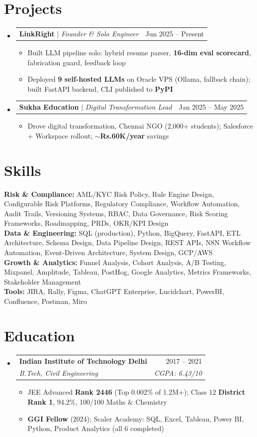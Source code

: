 \documentclass[a4paper,10pt]{article}
\makeatletter
\newcommand{\resumeItem}[1]{
  \item\small{#1\vspace{-2pt}}
}
\newcommand{\resumeSubheading}[4]{
  \vspace{-2pt}\item
  \begin{tabular*}{0.97\textwidth}[t]{l@{\extracolsep{\fill}}r}
    \textbf{#1} & #2 \\
    \textit{\small#3} & \textit{\small #4} \\
  \end{tabular*}\vspace{-7pt}
}
\newcommand{\resumeProjectHeading}[2]{
  \item
  \begin{tabular*}{0.97\textwidth}{l@{\extracolsep{\fill}}r}
    \small#1 & #2 \\
  \end{tabular*}\vspace{-7pt}
}
\newcommand{\resumeSubHeadingListStart}{\begin{itemize}[leftmargin=0.15in, label={}]}
\newcommand{\resumeSubHeadingListEnd}{\end{itemize}}
\newcommand{\resumeItemListStart}{\begin{itemize}\parfillskip=0pt}
\newcommand{\resumeItemListEnd}{\end{itemize}\vspace{-5pt}}
\makeatother
\begin{document}
\section{Projects}
\resumeSubHeadingListStart

  \resumeProjectHeading
    {\textbf{LinkRight} $|$ \emph{Founder \& Solo Engineer}}{Jun 2025 -- Present}
  \resumeItemListStart
    \resumeItem{Built LLM pipeline solo: hybrid resume parser, \textbf{16-dim eval scorecard}, fabrication guard, feedback loop}
    \resumeItem{Deployed \textbf{9 self-hosted LLMs} on Oracle VPS (Ollama, fallback chain); built FastAPI backend, CLI published to \textbf{PyPI}}
  \resumeItemListEnd

  \resumeProjectHeading
    {\textbf{Sukha Education} $|$ \emph{Digital Transformation Lead}}{Jan 2025 -- May 2025}
  \resumeItemListStart
    \resumeItem{Drove digital transformation, Chennai NGO (2,000+ students); Salesforce + Workspace rollout; \textbf{$\sim$Rs.60K/year} savings}
  \resumeItemListEnd

\resumeSubHeadingListEnd

\section{Skills}
\begin{itemize}[leftmargin=0.15in, label={}]
  \small{\item{
    \textbf{Risk \& Compliance:}{ AML/KYC Risk Policy, Rule Engine Design, Configurable Risk Platforms, Regulatory Compliance, Workflow Automation, Audit Trails, Versioning Systems, RBAC, Data Governance, Risk Scoring Frameworks, Roadmapping, PRDs, OKR/KPI Design} \\
    \textbf{Data \& Engineering:}{ SQL (production), Python, BigQuery, FastAPI, ETL Architecture, Schema Design, Data Pipeline Design, REST APIs, N8N Workflow Automation, Event-Driven Architecture, System Design, GCP/AWS} \\
    \textbf{Growth \& Analytics:}{ Funnel Analysis, Cohort Analysis, A/B Testing, Mixpanel, Amplitude, Tableau, PostHog, Google Analytics, Metrics Frameworks, Stakeholder Management} \\
    \textbf{Tools:}{ JIRA, Rally, Figma, ChatGPT Enterprise, Lucidchart, PowerBI, Confluence, Postman, Miro}
  }}
\end{itemize}

\section{Education}
\resumeSubHeadingListStart
  \resumeSubheading
    {Indian Institute of Technology Delhi}{2017 -- 2021}
    {B.Tech, Civil Engineering}{CGPA: 6.43/10}
  \resumeItemListStart
    \resumeItem{JEE Advanced \textbf{Rank 2446} (Top 0.002\% of 1.2M+); Class 12 \textbf{District Rank 1}, 94.2\%, 100/100 Maths \& Chemistry}
    \resumeItem{\textbf{GGI Fellow} (2024); Scaler Academy: SQL, Excel, Tableau, Power BI, Python, Product Analytics (all 6 completed)}
  \resumeItemListEnd
\resumeSubHeadingListEnd
\end{document}
